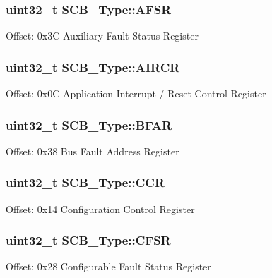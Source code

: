\subsubsection[{\texorpdfstring{A\+F\+SR}{AFSR}}]{ uint32\+\_\+t S\+C\+B\+\_\+\+Type\+::\+A\+F\+SR}\hypertarget{structSCB__Type_aeb77053c84f49c261ab5b8374e8958ef}{}\label{structSCB__Type_aeb77053c84f49c261ab5b8374e8958ef}
Offset\+: 0x3C Auxiliary Fault Status Register 
\subsubsection[{\texorpdfstring{A\+I\+R\+CR}{AIRCR}}]{ uint32\+\_\+t S\+C\+B\+\_\+\+Type\+::\+A\+I\+R\+CR}\hypertarget{structSCB__Type_a6ed3c9064013343ea9fd0a73a734f29d}{}\label{structSCB__Type_a6ed3c9064013343ea9fd0a73a734f29d}
Offset\+: 0x0C Application Interrupt / Reset Control Register 
\subsubsection[{\texorpdfstring{B\+F\+AR}{BFAR}}]{ uint32\+\_\+t S\+C\+B\+\_\+\+Type\+::\+B\+F\+AR}\hypertarget{structSCB__Type_a31f79afe86c949c9862e7d5fce077c3a}{}\label{structSCB__Type_a31f79afe86c949c9862e7d5fce077c3a}
Offset\+: 0x38 Bus Fault Address Register 
\subsubsection[{\texorpdfstring{C\+CR}{CCR}}]{ uint32\+\_\+t S\+C\+B\+\_\+\+Type\+::\+C\+CR}\hypertarget{structSCB__Type_a6d273c6b90bad15c91dfbbad0f6e92d8}{}\label{structSCB__Type_a6d273c6b90bad15c91dfbbad0f6e92d8}
Offset\+: 0x14 Configuration Control Register 
\subsubsection[{\texorpdfstring{C\+F\+SR}{CFSR}}]{ uint32\+\_\+t S\+C\+B\+\_\+\+Type\+::\+C\+F\+SR}\hypertarget{structSCB__Type_a2f94bf549b16fdeb172352e22309e3c4}{}\label{structSCB__Type_a2f94bf549b16fdeb172352e22309e3c4}
Offset\+: 0x28 Configurable Fault Status Register 
